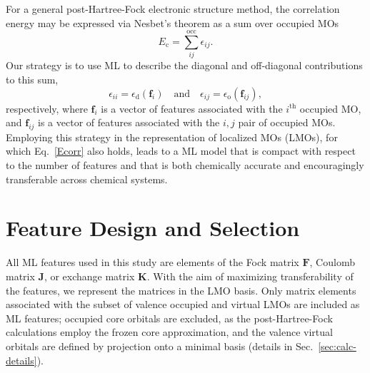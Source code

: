 \documentclass[%
 aps,
 prb,
 twocolumn,
%
 reprint,%
%
citeautoscript,
%
showkeys
]{revtex4-1}
\begin{document}
For a general post-Hartree-Fock electronic structure method, the correlation energy may be expressed via Nesbet's theorem as a sum over occupied MOs\cite{Nesbet1958}  %
\begin{equation}
\label{Ecorr}
E_\textrm{c} 
=\sum^{\textrm{occ}}_{ij}\epsilon_{ij}.
\end{equation}
Our strategy %
is to use ML to describe the diagonal and off-diagonal contributions to this sum,
\begin{equation}
\label{energies}
\epsilon_{ii} = \epsilon_\textrm{d}\left(\textbf{f}_{i} \right) \quad\textrm{and}\quad
%
\epsilon_{ij} = \epsilon_\textrm{o}\left(\textbf{f}_{ij} \right),
\end{equation}
respectively, where $\textbf{f}_{i}$ is a vector of features associated with the $i^{\textrm{th}}$ occupied MO, and $\textbf{f}_{ij}$ is a vector of features associated with the $i,j$ pair of occupied MOs.  %
%
Employing this strategy in the representation of localized MOs (LMOs), for which Eq.~\ref{Ecorr} also holds,  %
%
leads to a ML model 
that is compact with respect to the number of  features and that is both chemically accurate and encouragingly transferable across chemical systems. 
%



%


\section{Feature Design and Selection}\label{sec:feature_design}
%
%
 All ML features used  in this study are elements of  %
%
the Fock matrix $\mathbf{F}$, Coulomb  matrix $\mathbf{J}$, or  exchange matrix $\mathbf{K}$. 
 With the aim of maximizing transferability of the features, we represent the matrices in the LMO basis. %
Only matrix elements associated with the subset of valence occupied and virtual LMOs are included as ML features; occupied core orbitals are excluded, as the post-Hartree-Fock calculations employ the frozen core approximation, and 
 the valence virtual orbitals are defined by projection onto a minimal basis (details in Sec.~\ref{sec:calc-details}).\cite{Subotnik2005} %
\end{document}
